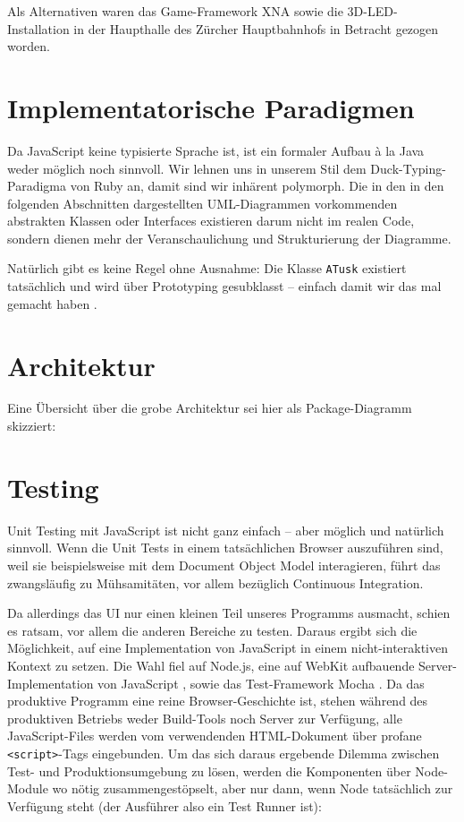 \documentclass[11pt]{scrreprt} %
\theoremstyle{definition}
\begin{document}
Als Alternativen waren das Game-Framework XNA sowie die 3D-LED-Installation in der Haupthalle des Zürcher Hauptbahnhofs in Betracht gezogen worden.

\section{Implementatorische Paradigmen}

Da JavaScript keine typisierte Sprache ist, ist ein formaler Aufbau à la Java weder möglich noch sinnvoll. Wir lehnen uns in unserem Stil dem Duck-Typing-Paradigma von Ruby an, damit sind wir inhärent polymorph. Die in den in den folgenden Abschnitten dargestellten UML-Diagrammen vorkommenden abstrakten Klassen oder Interfaces existieren darum nicht im realen Code, sondern dienen mehr der Veranschaulichung und Strukturierung der Diagramme.

Natürlich gibt es keine Regel ohne Ausnahme: Die Klasse {\tt ATusk} existiert tatsächlich und wird über Prototyping gesubklasst -- einfach damit wir das mal gemacht haben \cite{OOJSone, OOJStwo, OOJSthree}.

\section{Architektur}

Eine Übersicht über die grobe Architektur sei hier als Package-Diagramm skizziert:


\section{Testing}

Unit Testing mit JavaScript ist nicht ganz einfach -- aber möglich und natürlich sinnvoll. Wenn die Unit Tests in einem tatsächlichen Browser auszuführen sind, weil sie beispielsweise mit dem Document Object Model interagieren, führt das zwangsläufig zu Mühsamitäten, vor allem bezüglich Continuous Integration.

Da allerdings das UI nur einen kleinen Teil unseres Programms ausmacht, schien es ratsam, vor allem die anderen Bereiche zu testen. Daraus ergibt sich die Möglichkeit, auf eine Implementation von JavaScript in einem nicht-interaktiven Kontext zu setzen. Die Wahl fiel auf Node.js, eine auf WebKit aufbauende Server-Implementation von JavaScript \cite{Node}, sowie das Test-Framework Mocha \cite{Mocha}.
Da das produktive Programm eine reine Browser-Geschichte ist, stehen während des produktiven Betriebs weder Build-Tools noch Server zur Verfügung, alle JavaScript-Files werden vom verwendenden HTML-Dokument über profane {\tt <script>}-Tags eingebunden.
Um das sich daraus ergebende Dilemma zwischen Test- und Produktionsumgebung zu lösen, werden die Komponenten über Node-Module wo nötig zusammengestöpselt, aber nur dann, wenn Node tatsächlich zur Verfügung steht (der Ausführer also ein Test Runner ist):
\end{document}
